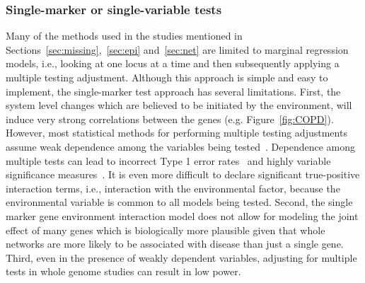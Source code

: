 \documentclass[12pt,letterpaper]{article}
\begin{document}
\subsubsection{Single-marker or single-variable tests} \label{sec:single}
Many of the methods used in the studies mentioned in Sections~\ref{sec:missing},~\ref{sec:epi} and~\ref{sec:net} are limited to marginal regression models, i.e., looking at one locus at a time and then subsequently applying a multiple testing adjustment. 
Although this approach is simple and easy to implement, the single-marker test approach has several limitations. First, the system level changes which are believed to be initiated by the environment, will induce very strong correlations between the genes (e.g. Figure~\ref{fig:COPD}). 
However, most statistical methods for performing multiple testing adjustments assume weak dependence among the variables being tested~\citep{leek2008general}. 
Dependence among multiple tests can lead to incorrect Type 1 error rates~\citep{lin2013test} and highly variable significance measures~\citep{leek2008general}. 
It is even more difficult to declare significant true-positive interaction terms, i.e., interaction with the environmental factor, because the environmental variable is common to all models being tested. 
Second, the single marker gene environment interaction model does not allow for modeling the joint effect of many genes which is biologically more plausible given that whole networks are more likely to be associated with disease than just a single gene. 
Third, even in the presence of weakly dependent variables, adjusting for multiple tests in whole genome studies can result in low power.

\end{document}
